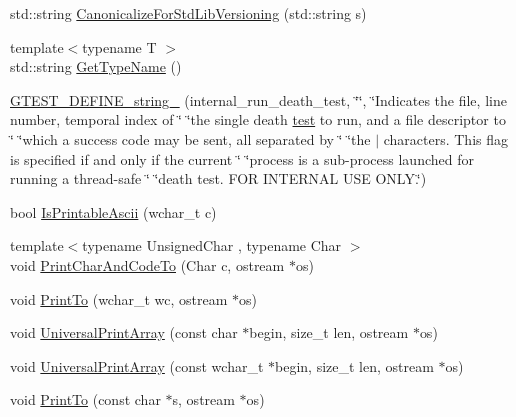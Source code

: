 \begin{DoxyCompactItemize}
\item 
std\+::string \mbox{\hyperlink{namespacetesting_1_1internal_a5342e843f087081705094beae07b557b}{Canonicalize\+For\+Std\+Lib\+Versioning}} (std\+::string s)
\item 
{\footnotesize template$<$typename T $>$ }\\std\+::string \mbox{\hyperlink{namespacetesting_1_1internal_a635606b4731f843c86ec8ca51cab83a1}{Get\+Type\+Name}} ()
\item 
\mbox{\hyperlink{namespacetesting_1_1internal_a20bfd9d47d8dd167ffc1c37a4c9ff73e}{G\+T\+E\+S\+T\+\_\+\+D\+E\+F\+I\+N\+E\+\_\+string\+\_\+}} (internal\+\_\+run\+\_\+death\+\_\+test, \char`\"{}\char`\"{}, \char`\"{}Indicates the file, line number, temporal index of \char`\"{} \char`\"{}the single death \mbox{\hyperlink{_mutual_8h_a707ee03719e99670bf6cfdfd897b8456}{test}} to run, and a file descriptor to \char`\"{} \char`\"{}which a success code may be sent, all separated by \char`\"{} \char`\"{}the \textquotesingle{}$\vert$\textquotesingle{} characters.  This flag is specified if and only if the current \char`\"{} \char`\"{}process is a sub-\/process launched for running a thread-\/safe \char`\"{} \char`\"{}death test.  F\+OR I\+N\+T\+E\+R\+N\+AL U\+SE O\+N\+L\+Y.\char`\"{})
\item 
bool \mbox{\hyperlink{namespacetesting_1_1internal_a744a6dd74c12d1e2c16b3c03e14ed4d4}{Is\+Printable\+Ascii}} (wchar\+\_\+t c)
\item 
{\footnotesize template$<$typename Unsigned\+Char , typename Char $>$ }\\void \mbox{\hyperlink{namespacetesting_1_1internal_a0c577e598e61d339ba45dd6643fb1969}{Print\+Char\+And\+Code\+To}} (Char c, ostream $\ast$os)
\item 
void \mbox{\hyperlink{namespacetesting_1_1internal_aa74ea9d64f76ce69eceb225ca5ebef58}{Print\+To}} (wchar\+\_\+t wc, ostream $\ast$os)
\item 
void \mbox{\hyperlink{namespacetesting_1_1internal_a070107e7a8205ad6ec4d538d52b15b38}{Universal\+Print\+Array}} (const char $\ast$begin, size\+\_\+t len, ostream $\ast$os)
\item 
void \mbox{\hyperlink{namespacetesting_1_1internal_a52394019018eb5079f9f1bcca23dcd60}{Universal\+Print\+Array}} (const wchar\+\_\+t $\ast$begin, size\+\_\+t len, ostream $\ast$os)
\item 
void \mbox{\hyperlink{namespacetesting_1_1internal_adc6c98306d40b53fd07be4e295102a0a}{Print\+To}} (const char $\ast$s, ostream $\ast$os)
\item 

\end{DoxyCompactItemize}
